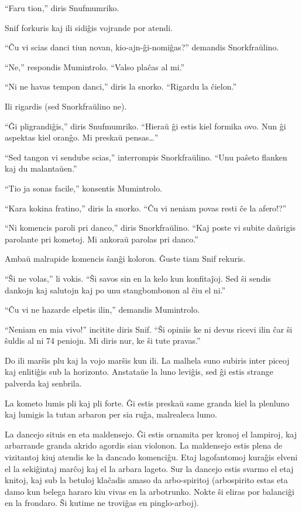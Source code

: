 ``Faru tion,'' diris Snufmumriko.

Snif forkuris kaj ili sidiĝis vojrande por atendi.

``Ĉu vi scias danci tiun novan, kio-ajn-ĝi-nomiĝas?'' demandis Snorkfraŭlino.

``Ne,'' respondis Mumintrolo. ``Valso plaĉas al mi.''

``Ni ne havas tempon danci,'' diris la snorko. ``Rigardu la ĉielon.''

Ili rigardis (sed Snorkfraŭlino ne).

``Ĝi pligrandiĝis,'' diris Snufmumriko. ``Hieraŭ ĝi estis kiel formika ovo. Nun ĝi aspektas kiel oranĝo. Mi preskaŭ pensas{\ldots}''

``Sed tangon vi sendube scias,'' interrompis Snorkfraŭlino. ``Unu paŝeto flanken kaj du malantaŭen.''

``Tio ja sonas facile,'' konsentis Mumintrolo.

``Kara kokina fratino,'' diris la snorko. ``Ĉu vi neniam povas resti ĉe la afero!?''

``Ni komencis paroli pri danco,'' diris Snorkfraŭlino. ``Kaj poste vi subite daŭrigis parolante pri kometoj. Mi ankoraŭ parolas pri danco.''

Ambaŭ malrapide komencis ŝanĝi koloron. Ĝuste tiam Snif rekuris.

``Ŝi ne volas,'' li vokis. ``Ŝi savos sin en la kelo kun konfitaĵoj. Sed ŝi sendis dankojn kaj salutojn kaj po unu stangbombonon al ĉiu el ni.''

``Ĉu vi ne hazarde elpetis ilin,'' demandis Mumintrolo.

``Neniam en mia vivo!'' incitite diris Snif. ``Ŝi opiniis ke ni devus ricevi ilin ĉar ŝi ŝuldis al ni 74 peniojn. Mi diris nur, ke ŝi tute pravas.''

Do ili marŝis plu kaj la vojo marŝis kun ili. La malhela suno subiris inter piceoj kaj enlitiĝis sub la horizonto. Anstataŭe la luno leviĝis, sed ĝi estis strange palverda kaj senbrila.

La kometo lumis pli kaj pli forte. Ĝi estis preskaŭ same granda kiel la plenluno kaj lumigis la tutan arbaron per sia ruĝa, malrealeca lumo.

La dancejo situis en eta maldensejo. Ĝi estis ornamita per kronoj el lampiroj, kaj arbarrande granda akrido agordis sian violonon. La maldensejo estis plena de vizitantoj kiuj atendis ke la dancado komenciĝu. Etaj lagofantomoj kuraĝis elveni el la sekiĝintaj marĉoj kaj el la arbara lageto. Sur la dancejo estis svarmo el etaj knitoj, kaj sub la betuloj klaĉadis amaso da arbo-spiritoj (arbospirito estas eta damo kun belega hararo kiu vivas en la arbotrunko. Nokte ŝi eliras por balanciĝi en la frondaro. Ŝi kutime ne troviĝas en pinglo-arboj).

